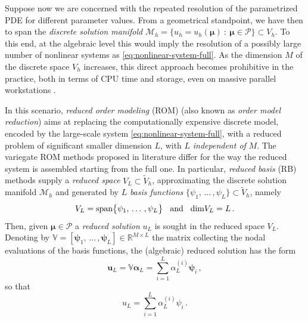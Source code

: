 \documentclass[12pt, a4paper, twoside, openright]{report}
\numberwithin{equation}{chapter}
\theoremstyle{theorem}
\theoremstyle{definition}
\theoremstyle{remark}
\theoremstyle{proposition}
\numberwithin{figure}{chapter}
\newcommand{\wt}[1]{\widetilde{#1}}
\begin{document}
		Suppose now we are concerned with the repeated resolution of the parametrized PDE for different parameter values. From a geometrical standpoint, we have then to span the \emph{discrete solution manifold} $\mathcal{M}_h = \big\lbrace u_h = u_h(\boldsymbol{\mu}) ~ : ~ \boldsymbol{\mu} \in \mathcal{P} \big\rbrace \subset V_h$. To this end, at the algebraic level this would imply the resolution of a possibly large number of nonlinear systems as \eqref{eq:nonlinear-system-full}. As the dimension $M$ of the discrete space $V_h$ increases, this direct approach becomes prohibitive in the practice, both in terms of CPU time and storage, even on massive parallel workstations \cite{QMN15}. 
		
		In this scenario, \emph{reduced order modeling} (ROM) (also known as \emph{order model reduction}) aims at replacing the computationally expensive discrete model, encoded by the large-scale system \eqref{eq:nonlinear-system-full}, with a reduced problem of significant smaller dimension $L$, with $L$ \emph{independent of} $M$. The variegate ROM methods proposed in literature differ for the way the reduced system is assembled starting from the full one. In particular, \emph{reduced basis} (RB) methods supply a \emph{reduced space} $V_L \subset \wt{V}_h$, approximating the discrete solution manifold $\mathcal{M}_h$ and generated by $L$ \emph{basis functions} $\big\lbrace \psi_1, \, \ldots \, , \psi_L \big\rbrace \subset \wt{V}_h$, namely
		\begin{equation*}
			V_L = \text{span}\big\lbrace \psi_1, \, \ldots \, , \psi_L \big\rbrace \hspace*{0.3cm} \text{and} \hspace*{0.3cm} \text{dim} V_L = L \, .
		\end{equation*}
		Then, given $\boldsymbol{\mu} \in \mathcal{P}$ a \emph{reduced solution} $u_L$ is sought in the reduced space $V_L$. Denoting by $\mathbb{V} = [\mathbf{\psi}_1, \, \ldots \, , \mathbf{\psi}_L] \in \mathbb{R}^{M \times L}$ the matrix collecting the nodal evaluations of the basis functions, the (algebraic) reduced solution has the form
		\begin{equation}
			\label{eq:reduced-solution-algebraic}
			\mathbf{u}_L = \mathbb{V} \boldsymbol{\alpha}_L = \sum_{i = 1}^L \alpha_L^{(i)} \mathbf{\psi}_i \, ,
		\end{equation}
		so that
		\begin{equation}
			\label{eq:reduced-solution}
			u_L = \sum_{i = 1}^L \alpha_L^{(i)} \psi_i \, .
		\end{equation}
\end{document}
